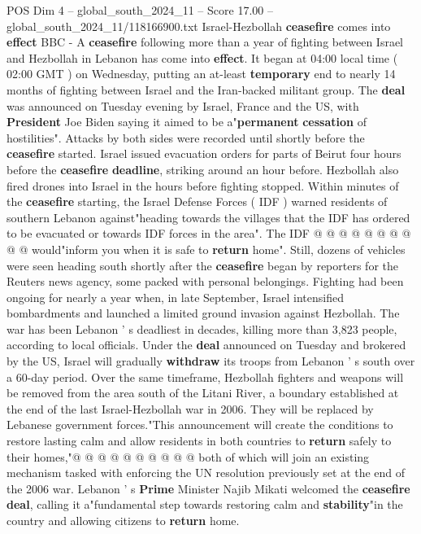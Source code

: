 \begin{textsample}{POS Dim 4 – global\_south\_2024\_11 – Score 17.00 – global\_south\_2024\_11/118166900.txt}  \label{ex:f4_pos_256}
Israel-Hezbollah \textbf{ceasefire} comes into \textbf{effect} BBC - A \textbf{ceasefire} following more than a year of fighting between Israel and Hezbollah in Lebanon has come into \textbf{effect}.
It began at 04:00 local time ( 02:00 GMT ) on Wednesday, putting an at-least \textbf{temporary} end to nearly 14 months of fighting between Israel and the Iran-backed militant group.
The \textbf{deal} was announced on Tuesday evening by Israel, France and the US, with \textbf{President} Joe Biden saying it aimed to be a"\textbf{permanent} \textbf{cessation} of hostilities".
Attacks by both sides were recorded until shortly before the \textbf{ceasefire} started.
Israel issued evacuation orders for parts of Beirut four hours before the \textbf{ceasefire} \textbf{deadline}, striking around an hour before.
Hezbollah also fired drones into Israel in the hours before fighting stopped.
Within minutes of the \textbf{ceasefire} starting, the Israel Defense Forces ( IDF ) warned residents of southern Lebanon against"heading towards the villages that the IDF has ordered to be evacuated or towards IDF forces in the area".
The IDF @ @ @ @ @ @ @ @ @ @ would"inform you when it is safe to \textbf{return} home".
Still, dozens of vehicles were seen heading south shortly after the \textbf{ceasefire} began by reporters for the Reuters news agency, some packed with personal belongings.
Fighting had been ongoing for nearly a year when, in late September, Israel intensified bombardments and launched a limited ground invasion against Hezbollah.
The war has been Lebanon ' s deadliest in decades, killing more than 3,823 people, according to local officials.
Under the \textbf{deal} announced on Tuesday and brokered by the US, Israel will gradually \textbf{withdraw} its troops from Lebanon ' s south over a 60-day period.
Over the same timeframe, Hezbollah fighters and weapons will be removed from the area south of the Litani River, a boundary established at the end of the last Israel-Hezbollah war in 2006.
They will be replaced by Lebanese government forces."This announcement will create the conditions to restore lasting calm and allow residents in both countries to \textbf{return} safely to their homes,"@ @ @ @ @ @ @ @ @ @ both of which will join an existing mechanism tasked with enforcing the UN resolution previously set at the end of the 2006 war.
Lebanon ' s \textbf{Prime} Minister Najib Mikati welcomed the \textbf{ceasefire} \textbf{deal}, calling it a"fundamental step towards restoring calm and \textbf{stability}"in the country and allowing citizens to \textbf{return} home.

\end{textsample}

